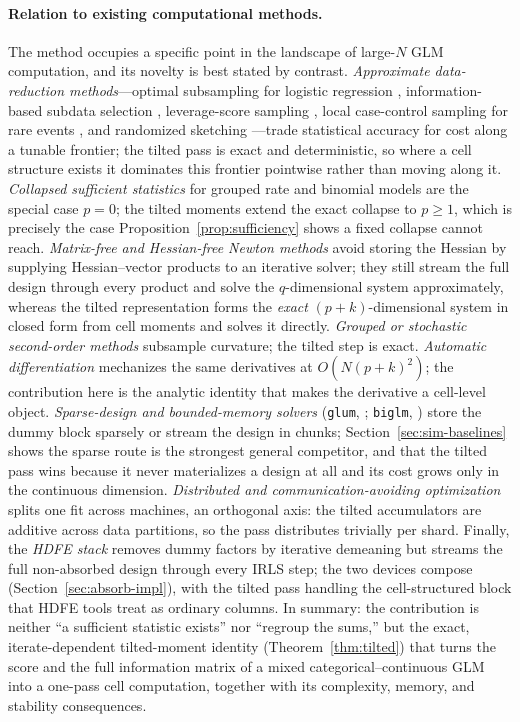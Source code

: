 \documentclass[11pt]{article}
\begin{document}
\paragraph{Relation to existing computational methods.}
The method occupies a specific point in the landscape of large-$N$ GLM
computation, and its novelty is best stated by contrast.
\emph{Approximate data-reduction methods}---optimal subsampling for
logistic regression \citep{wang2018}, information-based subdata
selection \citep{wang2019}, leverage-score sampling \citep{ma2015},
local case-control sampling for rare events \citep{fithian2014}, and
randomized sketching \citep{drineas2016}---trade statistical accuracy
for cost along a tunable frontier; the tilted pass is exact and
deterministic, so where a cell structure exists it dominates this
frontier pointwise rather than moving along it.  \emph{Collapsed
sufficient statistics} for grouped rate and binomial models
\citep{frome1983,clayton1993} are the special case $p = 0$; the tilted
moments extend the exact collapse to $p \ge 1$, which is precisely the
case Proposition~\ref{prop:sufficiency} shows a fixed collapse cannot
reach.  \emph{Matrix-free and Hessian-free Newton methods}
\citep{pearlmutter1994,martens2010,nocedal2006} avoid storing the
Hessian by supplying Hessian--vector products to an iterative solver;
they still stream the full design through every product and solve the
$q$-dimensional system approximately, whereas the tilted representation
forms the \emph{exact} $(p+k)$-dimensional system in closed form from
cell moments and solves it directly.  \emph{Grouped or stochastic
second-order methods} \citep{byrd2011} subsample curvature; the tilted
step is exact.  \emph{Automatic differentiation} \citep{baydin2018}
mechanizes the same derivatives at $O(N(p+k)^2)$; the contribution here
is the analytic identity that makes the derivative a cell-level object.
\emph{Sparse-design and bounded-memory solvers}
(\texttt{glum}, \citealp{tabmat2021}; \texttt{biglm},
\citealp{lumley2011}) store the dummy block sparsely or stream the
design in chunks; Section~\ref{sec:sim-baselines} shows the sparse route
is the strongest general competitor, and that the tilted pass wins
because it never materializes a design at all and its cost grows only
in the continuous dimension.  \emph{Distributed and
communication-avoiding optimization} \citep{zhang2013,jaggi2014}
splits one fit across machines, an orthogonal axis: the tilted
accumulators are additive across data partitions, so the pass
distributes trivially per shard.  Finally, the \emph{HDFE stack}
\citep{guimaraes2010,gaure2013,correia2016,correia2020,berge2018,
stammann2018} removes dummy factors by iterative demeaning but streams
the full non-absorbed design through every IRLS step; the two devices
compose (Section~\ref{sec:absorb-impl}), with the tilted pass handling
the cell-structured block that HDFE tools treat as ordinary columns.
In summary: the contribution is neither ``a sufficient statistic
exists'' nor ``regroup the sums,'' but the exact, iterate-dependent
tilted-moment identity (Theorem~\ref{thm:tilted}) that turns the score
and the full information matrix of a mixed categorical--continuous GLM
into a one-pass cell computation, together with its complexity, memory,
and stability consequences.
\end{document}
